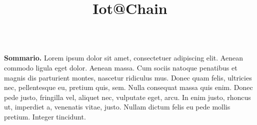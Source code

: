 \documentclass[25pt,portrait]{tikzposter}
\title{Iot@Chain}
\begin{document}
\settitle{\centering{  \fontsize{100}{120} \sc \@title \par}}
\maketitle


\begin{columns}
\end{columns}

\block{~}
{
  \huge
  \textbf{Sommario.} Lorem ipsum dolor sit amet, consectetuer adipiscing elit. Aenean commodo ligula eget dolor. Aenean massa. Cum sociis natoque penatibus et magnis dis parturient montes, nascetur ridiculus mus. Donec quam felis, ultricies nec, pellentesque eu, pretium quis, sem. Nulla consequat massa quis enim. Donec pede justo, fringilla vel, aliquet nec, vulputate eget, arcu. In enim justo, rhoncus ut, imperdiet a, venenatis vitae, justo. Nullam dictum felis eu pede mollis pretium. Integer tincidunt.
}

\begin{columns}
\end{columns}

\begin{columns}
\end{columns}
\end{document}

